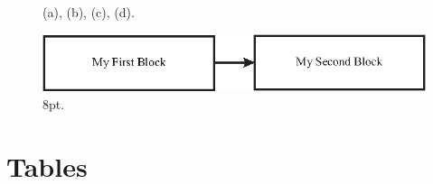 \documentclass[conference, a4paper]{IEEEtran}
\begin{document}
    \begin{figure}[]
        \centering
      \\
        \\
        \\\
      \caption{(a), (b), (c), (d).}
      \label{fig:figure4x1} 
    \end{figure}
    
    \begin{figure}[]
      \begin{center}{}
          \includegraphics[width=2\columnwidth,draft=false]{./figs/figure4.eps}
          \caption{8pt.}
          \label{fig:figurefull}
      \end{center}
    \end{figure}




\section{Tables}
\label{sec:tables}
\end{document}
